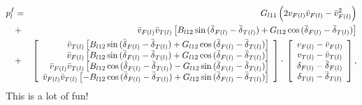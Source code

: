 \documentclass[11pt,twoside]{article}
\numberwithin{Theorem}{section}
\numberwithin{Definition}{section}
\numberwithin{Lemma}{section}
\numberwithin{Algorithm}{section}
\numberwithin{equation}{section}
\begin{document}
\begin{eqnarray}\label{eqn:horrible}
p_{l}^{f}&=&G_{l11}\left(2v_{F(l)}\bar{v}_{F(l)}-\bar{v}_{F(l)}^{2}\right)\\
&+&
\bar{v}_{F(l)}\bar{v}_{T(l)}
\left[
B_{l12}\sin{}(\bar{\delta{}}_{F(l)}-\bar{\delta{}}_{T(l)})
+G_{l12}\cos{}(\bar{\delta{}}_{F(l)}-\bar{\delta{}}_{T(l)})
\right]\notag\\
&+&
\left[\begin{array}{r}
      \bar{v}_{T(l)}
      \left[
      B_{l12}\sin{}(\bar{\delta{}}_{F(l)}-\bar{\delta{}}_{T(l)})
      +G_{l12}\cos{}(\bar{\delta{}}_{F(l)}-\bar{\delta{}}_{T(l)})
      \right]\\
      \bar{v}_{F(l)}
      \left[
      B_{l12}\sin{}(\bar{\delta{}}_{F(l)}-\bar{\delta{}}_{T(l)})
      +G_{l12}\cos{}(\bar{\delta{}}_{F(l)}-\bar{\delta{}}_{T(l)})
      \right]\\
      \bar{v}_{F(l)}\bar{v}_{T(l)}
      \left[
      B_{l12}\cos{}(\bar{\delta{}}_{F(l)}-\bar{\delta{}}_{T(l)})
      -G_{l12}\sin{}(\bar{\delta{}}_{F(l)}-\bar{\delta{}}_{T(l)})
      \right]\\
      \bar{v}_{F(l)}\bar{v}_{T(l)}
      \left[
      -B_{l12}\cos{}(\bar{\delta{}}_{F(l)}-\bar{\delta{}}_{T(l)})
      +G_{l12}\sin{}(\bar{\delta{}}_{F(l)}-\bar{\delta{}}_{T(l)})
      \right]\\
      \end{array}\right]
\cdot{}
\left[\begin{array}{c}
      v_{F(l)}-\bar{v}_{F(l)}\\
      v_{T(l)}-\bar{v}_{T(l)}\\
      \delta_{F(l)}-\bar{\delta{}}_{F(l)}\\
      \delta_{T(l)}-\bar{\delta{}}_{T(l)}
      \end{array}\right],\notag
\end{eqnarray}
This is a lot of fun!
\clearpage
\end{document}

